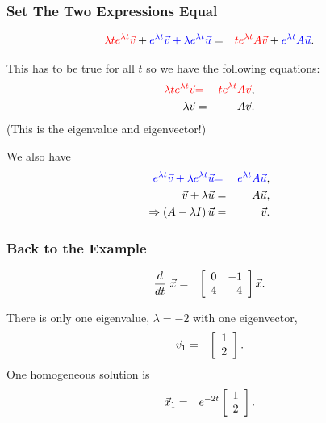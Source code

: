 \begin{frame}
  \frametitle{Set The Two Expressions Equal}

    \begin{eqnarray*}
      \redText{\lambda t e^{\lambda t} \vec{v}} + \blueText{e^{\lambda t} \vec{v} + \lambda e^{\lambda t} \vec{u}}
      & = & 
      \redText{t e^{\lambda t} A \vec{v}} + \blueText{e^{\lambda t} A \vec{u}}.
    \end{eqnarray*}
  
    This has to be true for all $t$ so we have the following equations:
    \begin{eqnarray*}
      \redText{\lambda t e^{\lambda t} \vec{v}} & \redText{=} & \redText{t e^{\lambda t} A \vec{v}}, \\
      \lambda \vec{v} & = & A \vec{v}.
    \end{eqnarray*}
    (This is the eigenvalue and eigenvector!)

    We also have 
    \begin{eqnarray*}
      \blueText{e^{\lambda t} \vec{v} + \lambda e^{\lambda t} \vec{u}} & \blueText{=} & \blueText{e^{\lambda t} A \vec{u}} , \\
      \vec{v} + \lambda \vec{u} & = &  A \vec{u}, \\
      \Rightarrow \lp A - \lambda I \rp \vec{u} & = & \vec{v}.
    \end{eqnarray*}

\end{frame}


\begin{frame}
  \frametitle{Back to the Example}

  \begin{eqnarray*}
    \deriv{~}{t} \vec{x} & = & \arrayTwo{0}{-1}{4}{-4} \vec{x}.
  \end{eqnarray*}


  There is only one eigenvalue, $\lambda=-2$ with one eigenvector,
  \begin{eqnarray*}
    \vec{v}_1 & = & \vecTwo{1}{2}.
  \end{eqnarray*}
  One homogeneous solution is 
  \begin{eqnarray*}
   \vec{x}_1 & = & e^{-2t}\vecTwo{1}{2}.
  \end{eqnarray*}


\end{frame}


